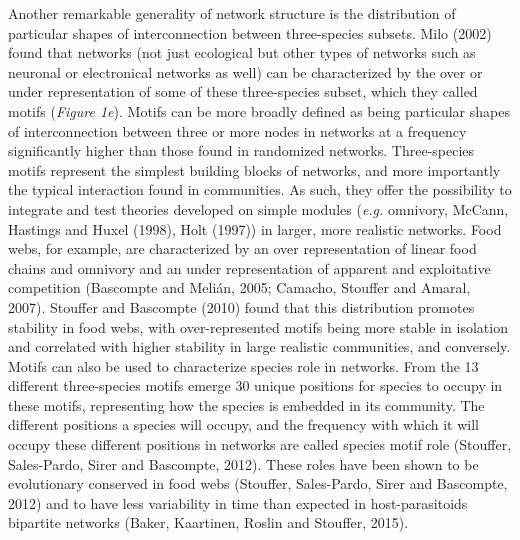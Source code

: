 \documentclass[12pt]{article}
\begin{document}
Another remarkable generality of network structure is the distribution
of particular shapes of interconnection between three-species subsets.
Milo (2002) found that networks (not just ecological but other types of
networks such as neuronal or electronical networks as well) can be
characterized by the over or under representation of some of these
three-species subset, which they called motifs (\emph{Figure 1e}).
Motifs can be more broadly defined as being particular shapes of
interconnection between three or more nodes in networks at a frequency
significantly higher than those found in randomized networks.
Three-species motifs represent the simplest building blocks of networks,
and more importantly the typical interaction found in communities. As
such, they offer the possibility to integrate and test theories
developed on simple modules (\emph{e.g.} omnivory, McCann, Hastings and
Huxel (1998), Holt (1997)) in larger, more realistic networks. Food
webs, for example, are characterized by an over representation of linear
food chains and omnivory and an under representation of apparent and
exploitative competition (Bascompte and Melián, 2005; Camacho, Stouffer
and Amaral, 2007). Stouffer and Bascompte (2010) found that this
distribution promotes stability in food webs, with over-represented
motifs being more stable in isolation and correlated with higher
stability in large realistic communities, and conversely. Motifs can
also be used to characterize species role in networks. From the 13
different three-species motifs emerge 30 unique positions for species to
occupy in these motifs, representing how the species is embedded in its
community. The different positions a species will occupy, and the
frequency with which it will occupy these different positions in
networks are called species motif role (Stouffer, Sales-Pardo, Sirer and
Bascompte, 2012). These roles have been shown to be evolutionary
conserved in food webs (Stouffer, Sales-Pardo, Sirer and Bascompte,
2012) and to have less variability in time than expected in
host-parasitoids bipartite networks (Baker, Kaartinen, Roslin and
Stouffer, 2015).
\end{document}
